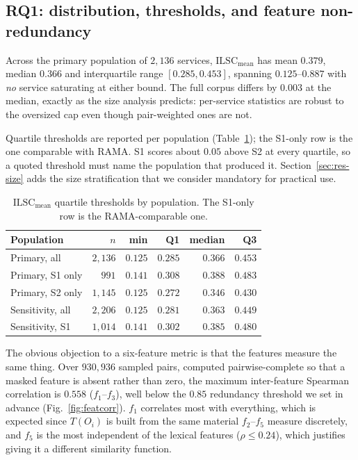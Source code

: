 \documentclass[journal]{IEEEtran}
\newcommand{\ilscm}{\ensuremath{\mathrm{ILSC}_{\mathrm{mean}}}}
\begin{document}
\subsection{RQ1: distribution, thresholds, and feature non-redundancy}
\label{sec:res-thresholds}
Across the primary population of $2{,}136$ services, $\ilscm$ has mean $0.379$,
median $0.366$ and interquartile range $[0.285,0.453]$, spanning
$0.125$--$0.887$ with \emph{no} service saturating at either bound. The full
corpus differs by $0.003$ at the median, exactly as the size analysis predicts:
per-service statistics are robust to the oversized cap even though pair-weighted
ones are not.

Quartile thresholds are reported per population (Table~\ref{tab:thresholds});
the S1-only row is the one comparable with RAMA. S1 scores about $0.05$ above S2
at every quartile, so a quoted threshold must name the population that produced
it. Section~\ref{sec:res-size} adds the size stratification that we consider
mandatory for practical use.

\begin{table}[!t]
\caption{$\ilscm$ quartile thresholds by population. The S1-only row is the
RAMA-comparable one.}
\label{tab:thresholds}
\centering
\footnotesize
\begin{tabular}{@{}lrrrrr@{}}
\toprule
\textbf{Population} & \textbf{$n$} & \textbf{min} & \textbf{Q1} &
\textbf{median} & \textbf{Q3} \\
\midrule
Primary, all & $2{,}136$ & $0.125$ & $0.285$ & $0.366$ & $0.453$ \\
Primary, S1 only & $991$ & $0.141$ & $0.308$ & $0.388$ & $0.483$ \\
Primary, S2 only & $1{,}145$ & $0.125$ & $0.272$ & $0.346$ & $0.430$ \\
Sensitivity, all & $2{,}206$ & $0.125$ & $0.281$ & $0.363$ & $0.449$ \\
Sensitivity, S1 & $1{,}014$ & $0.141$ & $0.302$ & $0.385$ & $0.480$ \\
\bottomrule
\end{tabular}
\end{table}

The obvious objection to a six-feature metric is that the features measure the
same thing. Over $930{,}936$ sampled pairs, computed pairwise-complete so that a
masked feature is absent rather than zero, the maximum inter-feature Spearman
correlation is $0.558$ ($f_1$--$f_3$), well below the $0.85$ redundancy
threshold we set in advance (Fig.~\ref{fig:featcorr}). $f_1$ correlates most
with everything, which is expected since $T(O_i)$ is built from the same
material $f_2$--$f_5$ measure discretely, and $f_5$ is the most independent of
the lexical features ($\rho \le 0.24$), which justifies giving it a different
similarity function.
\end{document}
